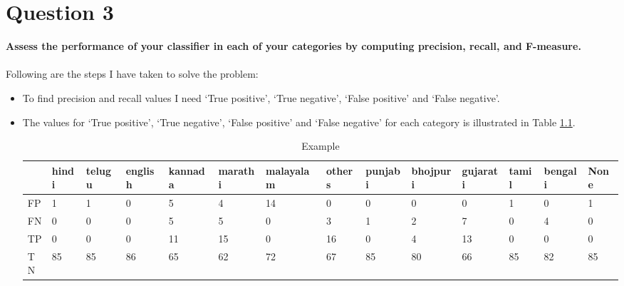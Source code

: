 \chapter{Question 3}
\label{available-representation}

\textbf{Assess the performance of your classifier in each of your categories by computing precision, recall, and F-measure. }\\\\

Following are the steps I have taken to solve the problem:

\begin{itemize}
\item To find precision and recall values I need `True positive', `True negative', `False positive' and `False negative'.
\item The values for `True positive', `True negative', `False positive' and `False negative' for each category is illustrated in Table \ref{q3table1}.
\begin{table}
\caption{Example}
\label{q3table1}
\begin{center}
\hspace{-2cm}
\begin{tabular}{|p{0.5cm}|p{1cm}|p{1cm}|p{1cm}|p{1.2cm}|p{1.2cm}|p{1.5cm}|p{1cm}|p{1cm}|p{1.2cm}|p{1.5cm}|p{1cm}|p{1cm}|p{1cm}|}
\hline
&hindi&telugu&english&kannada&marathi&malayalam&others&punjabi&bhojpuri&gujarati&tamil&bengali&None\\ \hline
FP&1&1&0&5&4&14&0&0&0&0&1&0&1\\ \hline
FN&0&0&0&5&5&0&3&1&2&7&0&4&0\\ \hline
TP&0&0&0&11&15&0&16&0&4&13&0&0&0\\ \hline
TN&85&85&86&65&62&72&67&85&80&66&85&82&85\\ \hline
\end{tabular}
\end{center}
\end{table}


\end{itemize}
